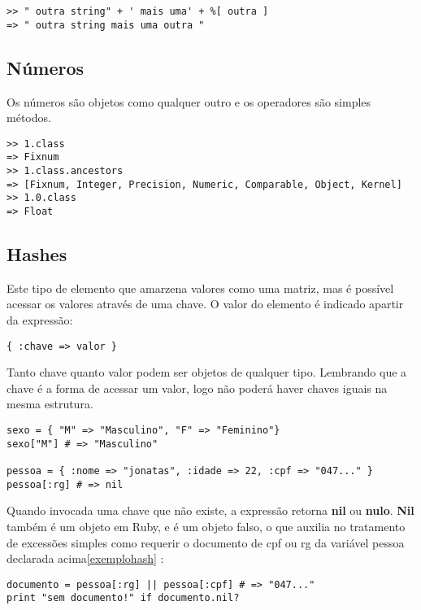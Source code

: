 \documentclass[espaco=simples,appendix=Name]{abnt}
\begin{document}
\begin{lstlisting}[caption=Exemplos de uso de string]
>> " outra string" + ' mais uma' + %[ outra ]
=> " outra string mais uma outra "
\end{lstlisting}

\subsection { Números }

Os números são objetos como qualquer outro e os operadores são simples métodos.

\begin{lstlisting}[caption=Exemplos de uso de números ]
>> 1.class
=> Fixnum
>> 1.class.ancestors
=> [Fixnum, Integer, Precision, Numeric, Comparable, Object, Kernel]
>> 1.0.class
=> Float
\end{lstlisting}

\subsection { Hashes }

Este tipo de elemento que amarzena valores como uma matriz, mas é possível acessar os valores através de uma chave. O valor do elemento é indicado apartir da expressão:

\begin{lstlisting}[caption=Syntaxe do hash]
{ :chave => valor }
\end{lstlisting}

Tanto chave quanto valor podem ser objetos de qualquer tipo. Lembrando que a chave é a forma de acessar um valor, logo não poderá haver chaves iguais na mesma estrutura. 

\begin{lstlisting}[label=exemplohash, caption=Exemplos de uso de hashes]
sexo = { "M" => "Masculino", "F" => "Feminino"}
sexo["M"] # => "Masculino"

pessoa = { :nome => "jonatas", :idade => 22, :cpf => "047..." }
pessoa[:rg] # => nil
\end{lstlisting}

Quando invocada uma chave que não existe, a expressão retorna \textbf{nil} ou \textbf{nulo}. \textbf{Nil} também é um objeto em Ruby, e é um objeto falso, o que auxilia no tratamento de excessões simples como requerir o documento de cpf ou rg da variável pessoa declarada acima\ref{exemplohash} :

\begin{lstlisting}[caption=Exemplos de uso de hashes com operador ou ]
documento = pessoa[:rg] || pessoa[:cpf] # => "047..."
print "sem documento!" if documento.nil?
\end{lstlisting}
\end{document}

